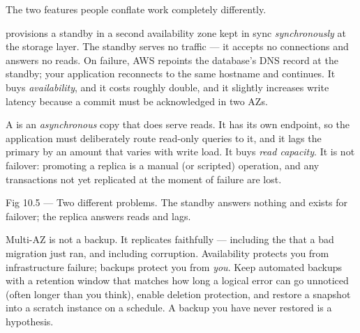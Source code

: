  The two features people conflate work completely differently.

 provisions a standby in a second availability zone kept in sync \emph{synchronously} at the storage layer. The standby serves no traffic --- it accepts no connections and answers no reads. On failure, AWS repoints the database's DNS record at the standby; your application reconnects to the same hostname and continues. It buys \emph{availability}, and it costs roughly double, and it slightly increases write latency because a commit must be acknowledged in two AZs.

A  is an \emph{asynchronous} copy that does serve reads. It has its own endpoint, so the application must deliberately route read-only queries to it, and it lags the primary by an amount that varies with write load. It buys \emph{read capacity}. It is not failover: promoting a replica is a manual (or scripted) operation, and any transactions not yet replicated at the moment of failure are lost.

\begin{wbfigure}{Fig 10.5 — Two different problems. The standby answers nothing and exists for failover; the replica answers reads and lags.}
\end{wbfigure}

\begin{drtip}
Multi-AZ is not a backup. It replicates faithfully --- including the  that a bad migration just ran, and including corruption. Availability protects you from infrastructure failure; backups protect you from \emph{you}. Keep automated backups with a retention window that matches how long a logical error can go unnoticed (often longer than you think), enable deletion protection, and restore a snapshot into a scratch instance on a schedule. A backup you have never restored is a hypothesis.
\end{drtip}


